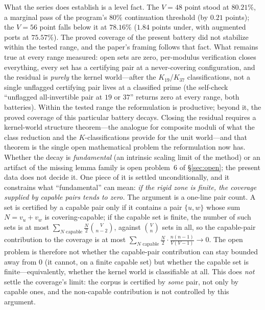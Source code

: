 \documentclass[11pt,a4paper]{article}
\numberwithin{equation}{section}
\theoremstyle{plain}
\theoremstyle{definition}
\theoremstyle{remark}
\begin{document}
What the series does establish is a level fact. The $V=48$ point stood
at $80.21\%$, a marginal pass of the program's $80\%$ continuation
threshold (by $0.21$ points); the $V=56$ point falls below it at
$78.16\%$ ($1.84$ points under, with augmented ports at $75.57\%$). The
proved coverage of the present battery did not stabilize within the
tested range, and the paper's framing follows that fact. What remains
true at every range measured: open sets are zero, per-modulus
verification closes everything, every set has a certifying pair at a
never-covering configuration, and the residual is \emph{purely} the
kernel world---after the $K_{19}$/$K_{37}$ classifications, not a single
unflagged certifying pair lives at a classified prime (the self-check
``unflagged all-invertible pair at $19$ or $37$'' returns zero at every
range, both batteries). Within the tested range the reformulation is
productive; beyond it, the proved coverage of this particular battery
decays. Closing the residual requires a kernel-world structure
theorem---the analogue for composite moduli of what the class reduction
and the $K$-classifications provide for the unit world---and that theorem
is the single open mathematical problem the reformulation now has.
Whether the decay is \emph{fundamental} (an intrinsic scaling limit of
the method) or an artifact of the missing lemma family is open
problem~6 of \S\ref{sec:open}; the present
data does not decide it. One piece of it is settled
unconditionally, and it constrains what ``fundamental'' can mean: \emph{if
the rigid zone is finite, the coverage supplied by capable pairs tends
to zero.} The argument is a one-line pair count. A set is certified by
a capable pair only if it contains a pair $\{u,w\}$ whose sum
$N=v_u+v_w$ is covering-capable; if the capable set is finite, the
number of such sets is at most
$\sum_{N\text{ capable}}\tfrac{N}{2}\binom{V}{n-2}$, against
$\binom{V}{n}$ sets in all, so the capable-pair contribution to the
coverage is at most
$\sum_{N\text{ capable}}\tfrac{N}{2}\cdot\tfrac{n(n-1)}{V(V-1)}\to 0$.
The open problem is therefore not whether the capable-pair contribution
can stay bounded away from $0$ (it cannot, on a finite capable set) but
whether the capable set is finite---equivalently, whether the kernel
world is classifiable at all. This does \emph{not} settle the coverage's
limit: the corpus is certified by \emph{some} pair, not only by capable
ones, and the non-capable contribution is not controlled by this
argument.
\end{document}

